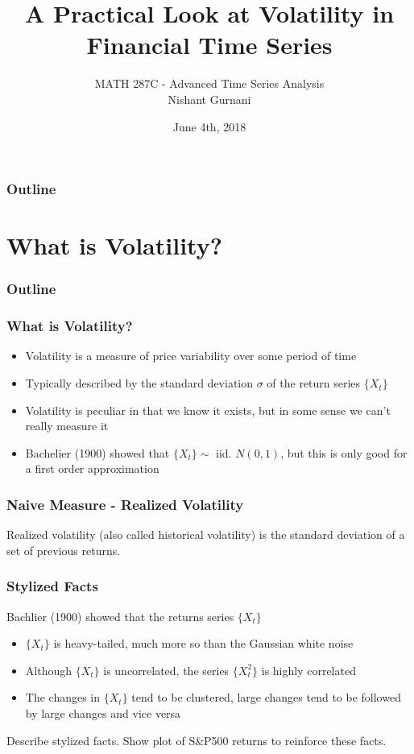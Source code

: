 \documentclass{beamer}
\title[]{A Practical Look at Volatility in Financial Time Series}
\author{MATH 287C - Advanced Time Series Analysis \\ Nishant Gurnani}
\date{June 4th, 2018}
\begin{document}
\begin{frame}
\titlepage
\end{frame}


\begin{frame}
\frametitle{Outline}
\tableofcontents[]
\end{frame}

\section{What is Volatility?}

\begin{frame}
\frametitle{Outline}
\tableofcontents[currentsection]
\end{frame}

\begin{frame}
\frametitle{What is Volatility?}
\begin{itemize}
\item{Volatility is a measure of price variability over some period of time}
\item{Typically described by the standard deviation $\sigma$ of the return series $\{X_t\}$}
\item{Volatility is peculiar in that we know it exists, but in some sense we can't really measure it}
\item{Bachelier (1900) showed that $\{X_t\} \sim$ iid. $N(0,1)$, but this is only good for a first order approximation}
\end{itemize}
\end{frame}

\begin{frame}
\frametitle{Naive Measure - Realized Volatility}
Realized volatility (also called historical volatility) is the standard deviation of a set of previous returns.

\end{frame}

\begin{frame}
\frametitle{Stylized Facts}

Bachlier (1900) showed that the returns series $\{X_t\}$


\begin{itemize}
\item{$\{X_t\}$ is heavy-tailed, much more so than the Gaussian white noise}
\item{Although $\{X_t\}$ is uncorrelated, the series $\{X_{t}^2\}$ is highly correlated}
\item{The changes in $\{X_t\}$ tend to be clustered, large changes tend to be followed by large changes and vice versa}
\end{itemize}

Describe stylized facts.
Show plot of S&P500 returns to reinforce these facts.
\end{frame}
\end{document}
